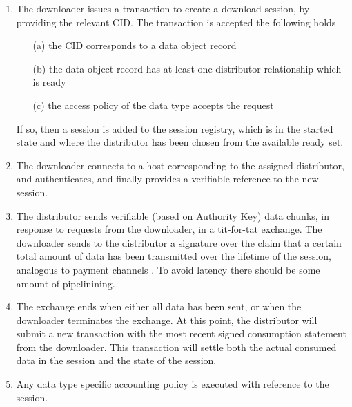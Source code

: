 \documentclass{article}
\begin{document}
\begin{enumerate}

\item
The downloader issues a transaction to create a download session, by providing the relevant CID. The transaction is accepted the following holds

      \begin{itemize}

      \item[(a)] the CID corresponds to a data object record

      \item[(b)] the data object record has at least one distributor relationship which is ready

      \item[(c)] the access policy of the data type accepts the request

      \end{itemize}

If so, then a session is added to the session registry, which is in the started state and where the distributor has been chosen from the available ready set.

\item
The downloader connects to a host corresponding to the assigned distributor, and authenticates, and finally provides a verifiable reference to the new session.

\item
The distributor sends verifiable (based on Authority Key) data chunks, in response to requests from the downloader, in a tit-for-tat exchange. The downloader sends to the distributor a signature over the claim that a certain total amount of data has been transmitted over the lifetime of the session, analogous to payment channels \cite{payment_channels}. To avoid latency there should be some amount of pipelinining.

\item
The exchange ends when either all data has been sent, or when the downloader terminates the exchange. At this point, the distributor will submit a new transaction with the most recent signed consumption statement from the downloader. This transaction will settle both the actual consumed data in the session and the state of the session.

\item
Any data type specific accounting policy is executed with reference to the session.

\end{enumerate}
\end{document}
